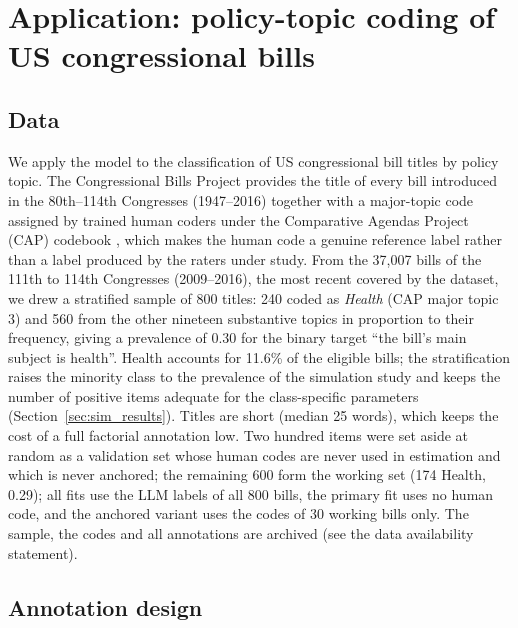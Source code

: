 \section{Application: policy-topic coding of US congressional bills}\label{sec:application}

\subsection{Data}\label{sec:app_data}

We apply the model to the classification of US congressional bill titles by policy topic. The
Congressional Bills Project \citep{Wilkerson2025} provides the title of every bill introduced in the 80th--114th Congresses (1947--2016) together with a major-topic code assigned by trained human coders under the Comparative
Agendas Project (CAP) codebook \citep{Jones2025}, which makes the human code a genuine reference
label rather than a label produced by the raters under study. From the 37,007 bills of the 111th to 114th Congresses (2009--2016), the most recent covered by the dataset, we drew a stratified sample of 800 titles: 240 coded as
\emph{Health} (CAP major topic 3) and 560 from the other nineteen substantive topics in proportion
to their frequency, giving a prevalence of 0.30 for the binary target ``the bill's main subject
is health''. Health accounts for 11.6\% of the eligible bills; the stratification raises the
minority class to the prevalence of the simulation study and keeps the number of positive items
adequate for the class-specific parameters (Section~\ref{sec:sim_results}). Titles are short
(median 25 words), which keeps the cost of a full factorial annotation low. Two hundred items were
set aside at random as a validation set whose human codes are never used in estimation and which
is never anchored; the remaining 600 form the working set (174 Health, 0.29); all fits use the LLM labels of all 800 bills, the primary fit uses no human code, and the anchored variant uses the codes of 30 working bills only. The sample, the
codes and all annotations are archived (see the data availability statement).

\subsection{Annotation design}\label{sec:app_design}


